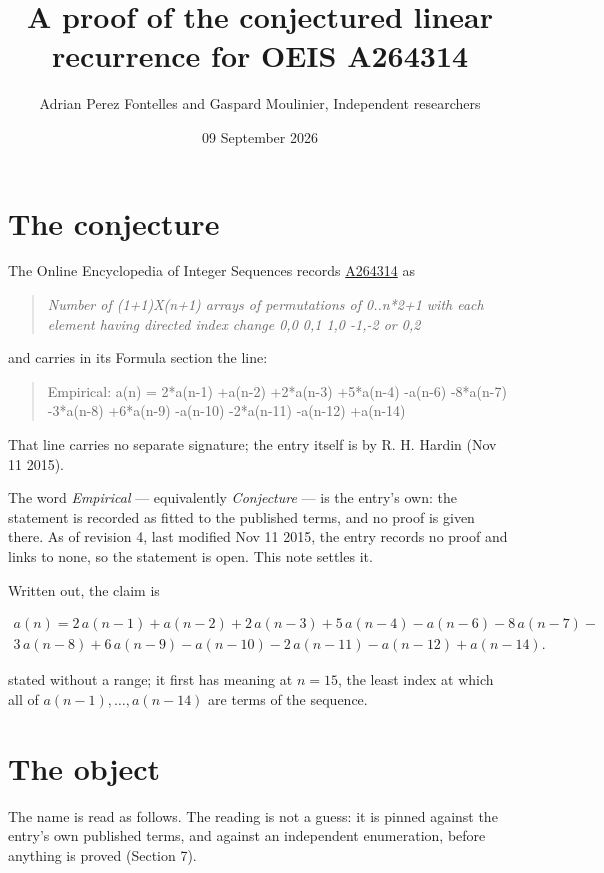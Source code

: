 \documentclass[11pt]{article}
\title{A proof of the conjectured linear recurrence for OEIS A264314}
\author{Adrian Perez Fontelles and Gaspard Moulinier, Independent researchers}
\date{09 September 2026}
\theoremstyle{definition}
\begin{document}
\maketitle
\section{The conjecture}

The Online Encyclopedia of Integer Sequences records \href{https://oeis.org/A264314}{A264314} as

\begin{quote}\itshape Number of (1+1)X(n+1) arrays of permutations of 0..n*2+1 with each element having directed index change 0,0 0,1 1,0 -1,-2 or 0,2\end{quote}

and carries in its Formula section the line:

\begin{quote}\ttfamily Empirical: a(n) = 2*a(n-1) +a(n-2) +2*a(n-3) +5*a(n-4) -a(n-6) -8*a(n-7) -3*a(n-8) +6*a(n-9) -a(n-10) -2*a(n-11) -a(n-12) +a(n-14)\end{quote}

That line carries no separate signature; the entry itself is by R. H. Hardin (Nov 11 2015).

The word {\itshape Empirical} --- equivalently {\itshape Conjecture} --- is the entry's own: the statement is recorded as fitted to the published terms, and no proof is given there. As of revision 4, last modified Nov 11 2015, the entry records no proof and links to none, so the statement is open. This note settles it.

Written out, the claim is

\begin{multline*} a(n) = 2\,a(n-1) + a(n-2) + 2\,a(n-3) + 5\,a(n-4) - a(n-6) - 8\,a(n-7) - \\ 3\,a(n-8) + 6\,a(n-9) - a(n-10) - 2\,a(n-11) - a(n-12) + a(n-14). \end{multline*}

stated without a range; it first has meaning at $n = 15$, the least index at which all of $a(n-1),\dots,a(n-14)$ are terms of the sequence.

\section{The object}

The name is read as follows. The reading is not a guess: it is pinned against the entry's own published terms, and against an independent enumeration, before anything is proved (Section 7).
\end{document}
